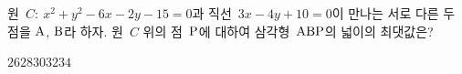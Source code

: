 원~$C:\ x^2+y^2-6x-2y-15=0$과 직선~$3x-4y+10=0$이 만나는 서로 다른 두 점을 $\mathrm{A}$, $\mathrm{B}$라 하자. 원~$C$ 위의 점~$\mathrm{P}$에 대하여 삼각형~$\mathrm{ABP}$의 넓이의 최댓값은? 
\begin{choices32}{$26$}{$28$}{$30$}{$32$}{$34$}\end{choices32}
